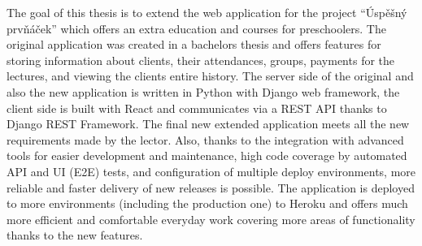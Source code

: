 The goal of this thesis is to extend the web application for the project ``Úspěšný prvňáček'' which offers an extra education and courses for preschoolers. The original application was created in a bachelor\textquotesingle s thesis and offers features for storing information about clients, their attendances, groups, payments for the lectures, and viewing the client\textquotesingle s entire history. The server side of the original and also the new application is written in Python with Django web framework, the client side is built with React and communicates via a REST API thanks to Django REST Framework. The final new extended application meets all the new requirements made by the lector. Also, thanks to the integration with advanced tools for easier development and maintenance, high code coverage by automated API and UI (E2E) tests, and configuration of multiple deploy environments, more reliable and faster delivery of new releases is possible. The application is deployed to more environments (including the production one) to Heroku and offers much more efficient and comfortable everyday work covering more areas of functionality thanks to the new features.
